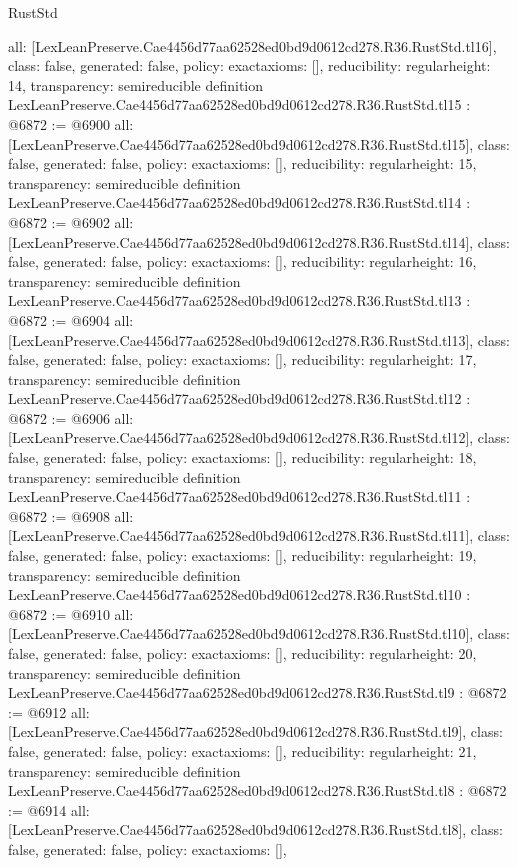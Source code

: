\begin{lexlean}{RustStd}
\begin{coremodule}
{  all: [LexLeanPreserve.Cae4456d77aa62528ed0bd9d0612cd278.R36.RustStd.tl16],
  class: false,
  generated: false,
  policy: exact{axioms: []},
  reducibility: regular{height: 14},
  transparency: semireducible
}
definition LexLeanPreserve.Cae4456d77aa62528ed0bd9d0612cd278.R36.RustStd.tl15 : @6872 := @6900 {
  all: [LexLeanPreserve.Cae4456d77aa62528ed0bd9d0612cd278.R36.RustStd.tl15],
  class: false,
  generated: false,
  policy: exact{axioms: []},
  reducibility: regular{height: 15},
  transparency: semireducible
}
definition LexLeanPreserve.Cae4456d77aa62528ed0bd9d0612cd278.R36.RustStd.tl14 : @6872 := @6902 {
  all: [LexLeanPreserve.Cae4456d77aa62528ed0bd9d0612cd278.R36.RustStd.tl14],
  class: false,
  generated: false,
  policy: exact{axioms: []},
  reducibility: regular{height: 16},
  transparency: semireducible
}
definition LexLeanPreserve.Cae4456d77aa62528ed0bd9d0612cd278.R36.RustStd.tl13 : @6872 := @6904 {
  all: [LexLeanPreserve.Cae4456d77aa62528ed0bd9d0612cd278.R36.RustStd.tl13],
  class: false,
  generated: false,
  policy: exact{axioms: []},
  reducibility: regular{height: 17},
  transparency: semireducible
}
definition LexLeanPreserve.Cae4456d77aa62528ed0bd9d0612cd278.R36.RustStd.tl12 : @6872 := @6906 {
  all: [LexLeanPreserve.Cae4456d77aa62528ed0bd9d0612cd278.R36.RustStd.tl12],
  class: false,
  generated: false,
  policy: exact{axioms: []},
  reducibility: regular{height: 18},
  transparency: semireducible
}
definition LexLeanPreserve.Cae4456d77aa62528ed0bd9d0612cd278.R36.RustStd.tl11 : @6872 := @6908 {
  all: [LexLeanPreserve.Cae4456d77aa62528ed0bd9d0612cd278.R36.RustStd.tl11],
  class: false,
  generated: false,
  policy: exact{axioms: []},
  reducibility: regular{height: 19},
  transparency: semireducible
}
definition LexLeanPreserve.Cae4456d77aa62528ed0bd9d0612cd278.R36.RustStd.tl10 : @6872 := @6910 {
  all: [LexLeanPreserve.Cae4456d77aa62528ed0bd9d0612cd278.R36.RustStd.tl10],
  class: false,
  generated: false,
  policy: exact{axioms: []},
  reducibility: regular{height: 20},
  transparency: semireducible
}
definition LexLeanPreserve.Cae4456d77aa62528ed0bd9d0612cd278.R36.RustStd.tl9 : @6872 := @6912 {
  all: [LexLeanPreserve.Cae4456d77aa62528ed0bd9d0612cd278.R36.RustStd.tl9],
  class: false,
  generated: false,
  policy: exact{axioms: []},
  reducibility: regular{height: 21},
  transparency: semireducible
}
definition LexLeanPreserve.Cae4456d77aa62528ed0bd9d0612cd278.R36.RustStd.tl8 : @6872 := @6914 {
  all: [LexLeanPreserve.Cae4456d77aa62528ed0bd9d0612cd278.R36.RustStd.tl8],
  class: false,
  generated: false,
  policy: exact{axioms: []},
}
\end{coremodule}
\end{lexlean}
